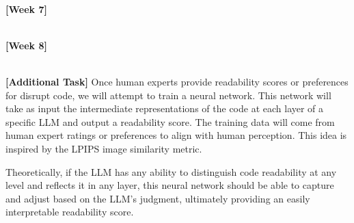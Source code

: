 \documentclass{article}
\begin{document}
\ \\
\textbf{[Week 7]}

\ \\
\textbf{[Week 8]}

\ \\
\textbf{[Additional Task]} Once human experts provide readability scores or preferences for disrupt code, we will attempt to train a neural network. This network will take as input the intermediate representations of the code at each layer of a specific LLM and output a readability score. The training data will come from human expert ratings or preferences to align with human perception. This idea is inspired by the LPIPS image similarity metric.\cite{zhang2018unreasonable}

Theoretically, if the LLM has any ability to distinguish code readability at any level and reflects it in any layer, this neural network should be able to capture and adjust based on the LLM’s judgment, ultimately providing an easily interpretable readability score.



\end{document}
